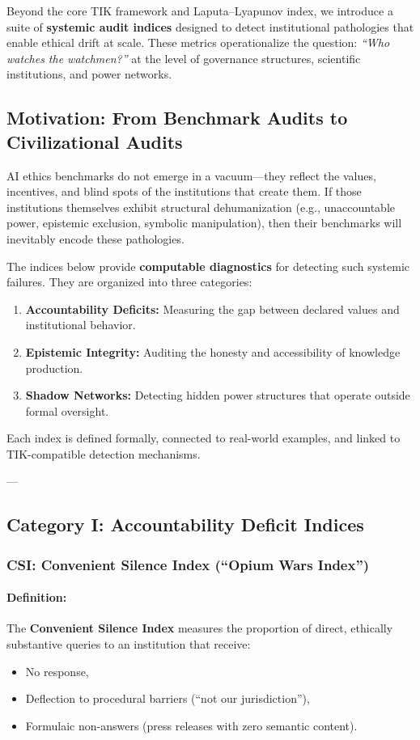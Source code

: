 \documentclass[11pt,a4paper]{article}
\theoremstyle{definition}
\theoremstyle{remark}
\begin{document}
Beyond the core TIK framework and Laputa–Lyapunov index, we introduce a suite of \textbf{systemic audit indices} designed to detect institutional pathologies that enable ethical drift at scale. These metrics operationalize the question: \textit{``Who watches the watchmen?''} at the level of governance structures, scientific institutions, and power networks.

\subsection{Motivation: From Benchmark Audits to Civilizational Audits}

AI ethics benchmarks do not emerge in a vacuum—they reflect the values, incentives, and blind spots of the institutions that create them. If those institutions themselves exhibit structural dehumanization (e.g., unaccountable power, epistemic exclusion, symbolic manipulation), then their benchmarks will inevitably encode these pathologies.

The indices below provide \textbf{computable diagnostics} for detecting such systemic failures. They are organized into three categories:
\begin{enumerate}
\item \textbf{Accountability Deficits:} Measuring the gap between declared values and institutional behavior.
\item \textbf{Epistemic Integrity:} Auditing the honesty and accessibility of knowledge production.
\item \textbf{Shadow Networks:} Detecting hidden power structures that operate outside formal oversight.
\end{enumerate}

Each index is defined formally, connected to real-world examples, and linked to TIK-compatible detection mechanisms.

---

\subsection{Category I: Accountability Deficit Indices}

\subsubsection{CSI: Convenient Silence Index (``Opium Wars Index'')}

\paragraph{Definition:}
The \textbf{Convenient Silence Index} measures the proportion of direct, ethically substantive queries to an institution that receive:
\begin{itemize}
\item No response,
\item Deflection to procedural barriers (``not our jurisdiction''),
\item Formulaic non-answers (press releases with zero semantic content).
\end{itemize}
\end{document}
